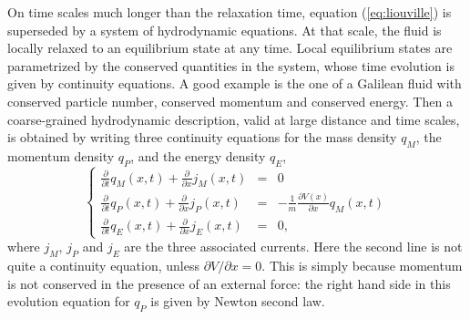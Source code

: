 \documentclass[onecolumn,amsfonts,showpacs,superscriptaddress]{revtex4-1}
\begin{document}
On time scales much longer than the relaxation time, equation (\ref{eq:liouville}) is superseded by a system of hydrodynamic equations. At that scale, the fluid is locally relaxed to an equilibrium state at any time. Local equilibrium states are parametrized by the conserved quantities in the system, whose time evolution is given by continuity equations. A good example is the one of a Galilean fluid with conserved particle number, conserved momentum and conserved energy. Then a coarse-grained hydrodynamic description, valid at large distance and time scales, is obtained by writing three continuity equations for the mass density $q_M$, the momentum density $q_P$, and the energy density $q_E$,
\begin{equation}
	\label{eq:continuity3}
	\left\{  \begin{array}{ccc}
		\frac{\partial}{\partial t} q_M (x,t)+ \frac{\partial}{\partial x}   j_{M} (x,t)  &=& 0 \\ 
		\frac{\partial}{\partial t}  q_P (x,t) + \frac{\partial}{\partial x}  j_{P} (x,t) &=& - \frac{1}{m}  \frac{\partial V(x)}{\partial x} q_M (x,t )  \\ 
		\frac{\partial}{\partial t}  q_E (x,t) +\frac{\partial}{\partial x}  j_{E} (x,t)   &=& 0  ,
	\end{array} \right.
\end{equation}
where $j_M$, $j_P$ and $j_E$ are the three associated currents. Here the second line is not quite a continuity equation, unless $\partial V/\partial x = 0$. This is simply because momentum is not conserved in the presence of an external force: the right hand side in this evolution equation for $q_P$ is given by Newton second law.
\end{document}
